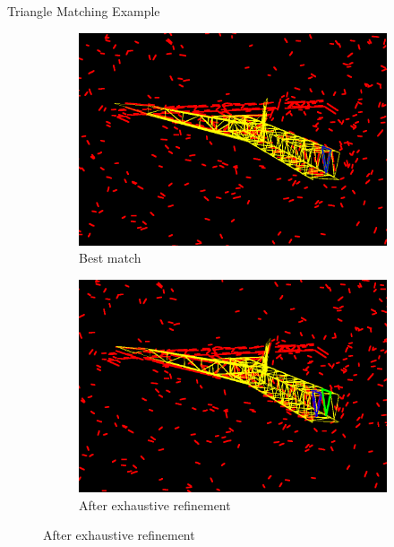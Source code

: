 \documentclass{beamer}
\begin{document}
\begin{frame}[t, fragile]{Triangle Matching Example}
\vspace{1cm}
\begin{figure}
\centering
\begin{subfigure}{.5\textwidth}
\centering
\includegraphics[scale=0.27]{triangle_match}
\caption{Best match}
\end{subfigure}%
\begin{subfigure}{.5\textwidth}
\centering
\includegraphics[scale=0.27]{triangle_match_refine}
\caption{After exhaustive refinement}
\end{subfigure}
\end{figure}
\end{frame}
\end{document}
